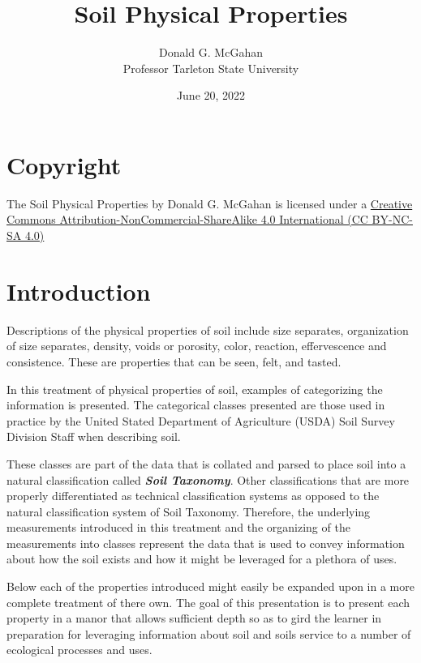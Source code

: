 \documentclass{article}
\title{Soil Physical Properties}
\author{Donald G. McGahan\\ Professor Tarleton State University}
\date{June 20, 2022}
\begin{document}
\maketitle

\frontmatter

\section*{Copyright}

The Soil Physical Properties by Donald G. McGahan is licensed under a \href{https://creativecommons.org/licenses/by-nc-sa/4.0/}{Creative Commons Attribution-NonCommercial-ShareAlike 4.0 International (CC BY-NC-SA 4.0)} 

\tableofcontents
\listoffigures
\listoftables

\mainmatter

\section{Introduction}
\label{introduction}


Descriptions of the physical properties of soil include size separates, organization of size separates, density, voids or porosity, color, reaction, effervescence and consistence.  These are properties that can be seen, felt, and tasted.

In this treatment of physical properties of soil, examples of categorizing the information is presented. The categorical classes presented are those used in practice by the United Stated Department of Agriculture (USDA) Soil Survey Division Staff when describing soil.

These classes are part of the data that is collated and parsed to place soil into a natural classification called \textbf{\textit{Soil Taxonomy}}. Other classifications that are more properly differentiated as technical classification systems as opposed to the natural classification system of Soil Taxonomy. Therefore, the underlying measurements introduced in this treatment and the organizing of the measurements into classes represent the data that is used to convey information about how the soil exists and how it might be leveraged for a plethora of uses.

Below each of the properties introduced might easily be expanded upon in a more complete treatment of there own. The goal of this presentation is to present each property in a manor that allows sufficient depth so as to gird the learner in preparation for leveraging information about soil and soils service to a number of ecological processes and uses.
\end{document}

